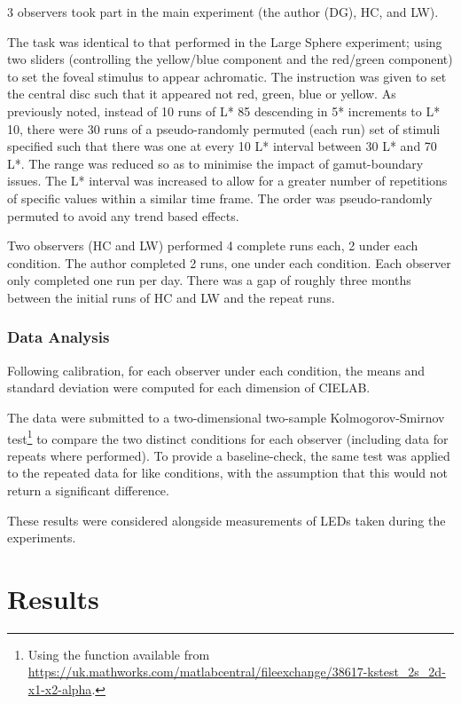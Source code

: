 3 observers took part in the main experiment (the author (DG), HC, and LW). 

The task was identical to that performed in the Large Sphere experiment; using two sliders (controlling the yellow/blue component and the red/green component) to set the foveal stimulus to appear achromatic. The instruction was given to set the central disc such that it appeared not red, green, blue or yellow. As previously noted, instead of 10 runs of L* 85 descending in 5* increments to L* 10, there were 30 runs of a pseudo-randomly permuted (each run) set of stimuli specified such that there was one at every 10 L* interval between 30 L* and 70 L*. The range was reduced so as to minimise the impact of gamut-boundary issues. The L* interval was increased to allow for a greater number of repetitions of specific values within a similar time frame. The order was pseudo-randomly permuted to avoid any trend based effects.

Two observers (HC and LW) performed 4 complete runs each, 2 under each condition. The author completed 2 runs, one under each condition. Each observer only completed one run per day. There was a gap of roughly three months between the initial runs of HC and LW and the repeat runs.

\subsubsection{Data Analysis}

Following calibration, for each observer under each condition, the means and standard deviation were computed for each dimension of CIELAB. 

The data were submitted to a two-dimensional two-sample Kolmogorov-Smirnov test\footnote{Using the function available from \url{https://uk.mathworks.com/matlabcentral/fileexchange/38617-kstest_2s_2d-x1-x2-alpha}.} to compare the two distinct conditions for each observer (including data for repeats where performed). To provide a baseline-check, the same test was applied to the repeated data for like conditions, with the assumption that this would not return a significant difference.

These results were considered alongside measurements of LEDs taken during the experiments.

\section{Results}

